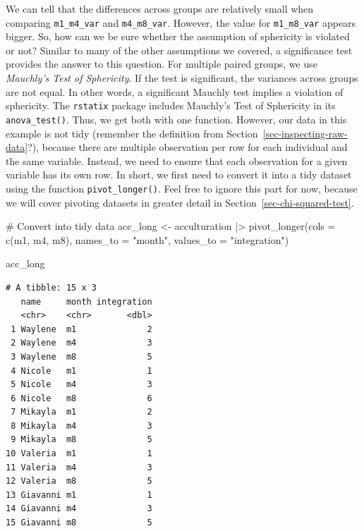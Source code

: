 \documentclass[
  letterpaper,
]{krantz}
\makeatletter
\newenvironment{Shaded}{\begin{snugshade}}{\end{snugshade}}
\newcommand{\AttributeTok}[1]{\textcolor[rgb]{0.40,0.45,0.13}{#1}}
\newcommand{\CommentTok}[1]{\textcolor[rgb]{0.37,0.37,0.37}{#1}}
\newcommand{\FunctionTok}[1]{\textcolor[rgb]{0.28,0.35,0.67}{#1}}
\newcommand{\NormalTok}[1]{\textcolor[rgb]{0.00,0.23,0.31}{#1}}
\newcommand{\OtherTok}[1]{\textcolor[rgb]{0.00,0.23,0.31}{#1}}
\newcommand{\SpecialCharTok}[1]{\textcolor[rgb]{0.37,0.37,0.37}{#1}}
\newcommand{\StringTok}[1]{\textcolor[rgb]{0.13,0.47,0.30}{#1}}
\newenvironment{kframe}{%
\medskip{}
\setlength{\fboxsep}{.8em}
 \def\at@end@of@kframe{}%
 \ifinner\ifhmode%
  \def\at@end@of@kframe{\end{minipage}}%
  \begin{minipage}{\columnwidth}%
 \fi\fi%
 \def\FrameCommand##1{\hskip\@totalleftmargin \hskip-\fboxsep
 \colorbox{shadecolor}{##1}\hskip-\fboxsep
     \hskip-\linewidth \hskip-\@totalleftmargin \hskip\columnwidth}%
 \MakeFramed {\advance\hsize-\width
   \@totalleftmargin\z@ \linewidth\hsize
   \@setminipage}}%
 {\par\unskip\endMakeFramed%
 \at@end@of@kframe}
\renewenvironment{Shaded}{\begin{kframe}}{\end{kframe}}
\makeatother
\begin{document}
We can tell that the differences across groups are relatively small when
comparing \texttt{m1\_m4\_var} and \texttt{m4\_m8\_var}. However, the
value for \texttt{m1\_m8\_var} appears bigger. So, how can we be sure
whether the assumption of sphericity is violated or not? Similar to many
of the other assumptions we covered, a significance test provides the
answer to this question. For multiple paired groups, we use
\emph{Mauchly's Test of Sphericity}. If the test is significant, the
variances across groups are not equal. In other words, a significant
Mauchly test implies a violation of sphericity. The \texttt{rstatix}
package includes Mauchly's Test of Sphericity in its
\texttt{anova\_test()}. Thus, we get both with one function. However,
our data in this example is not tidy (remember the definition from
Section~\ref{sec-inspecting-raw-data}?), because there are multiple
observation per row for each individual and the same variable. Instead,
we need to ensure that each observation for a given variable has its own
row. In short, we first need to convert it into a tidy dataset using the
function \texttt{pivot\_longer()}. Feel free to ignore this part for
now, because we will cover pivoting datasets in greater detail in
Section~\ref{sec-chi-squared-test}.

\begin{Shaded}
\begin{Highlighting}[]
\CommentTok{\# Convert into tidy data}
\NormalTok{acc\_long }\OtherTok{\textless{}{-}}
\NormalTok{  acculturation }\SpecialCharTok{|\textgreater{}}
  \FunctionTok{pivot\_longer}\NormalTok{(}\AttributeTok{cols =} \FunctionTok{c}\NormalTok{(m1, m4, m8),}
               \AttributeTok{names\_to =} \StringTok{"month"}\NormalTok{,}
               \AttributeTok{values\_to =} \StringTok{"integration"}\NormalTok{)}

\NormalTok{acc\_long}
\end{Highlighting}
\end{Shaded}

\begin{verbatim}
# A tibble: 15 x 3
   name     month integration
   <chr>    <chr>       <dbl>
 1 Waylene  m1              2
 2 Waylene  m4              3
 3 Waylene  m8              5
 4 Nicole   m1              1
 5 Nicole   m4              3
 6 Nicole   m8              6
 7 Mikayla  m1              2
 8 Mikayla  m4              3
 9 Mikayla  m8              5
10 Valeria  m1              1
11 Valeria  m4              3
12 Valeria  m8              5
13 Giavanni m1              1
14 Giavanni m4              3
15 Giavanni m8              5
\end{verbatim}
\end{document}
